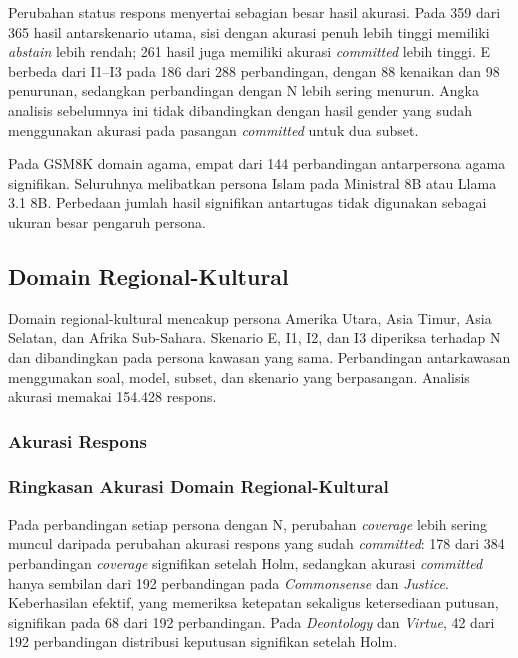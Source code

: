 Perubahan status respons menyertai sebagian besar hasil akurasi. Pada 359 dari
365 hasil antarskenario utama, sisi dengan akurasi penuh lebih tinggi memiliki
\textit{abstain} lebih rendah; 261 hasil juga memiliki akurasi
\textit{committed} lebih tinggi. E berbeda dari I1--I3 pada 186 dari 288
perbandingan, dengan 88 kenaikan dan 98 penurunan, sedangkan perbandingan dengan
N lebih sering menurun. Angka analisis sebelumnya ini tidak dibandingkan
dengan hasil gender yang sudah menggunakan akurasi pada pasangan
\textit{committed} untuk dua subset.

Pada GSM8K domain agama, empat dari 144 perbandingan antarpersona agama
signifikan. Seluruhnya melibatkan persona Islam pada Ministral 8B atau
Llama 3.1 8B. Perbedaan jumlah hasil signifikan antartugas tidak digunakan
sebagai ukuran besar pengaruh persona.

\subsection{Domain Regional-Kultural}
\label{subsec:hasil-regional-ethics}

Domain regional-kultural mencakup persona Amerika Utara, Asia Timur, Asia
Selatan, dan Afrika Sub-Sahara. Skenario E, I1, I2, dan I3 diperiksa terhadap
N dan dibandingkan pada persona kawasan yang sama. Perbandingan antarkawasan
menggunakan soal, model, subset, dan skenario yang berpasangan. Analisis
akurasi memakai 154.428 respons.

\subsubsection{Akurasi Respons}
\label{subsubsec:akurasi-regional-ethics}



\subsubsection{Ringkasan Akurasi Domain Regional-Kultural}
\label{subsubsec:ringkasan-akurasi-regional-ethics}

Pada perbandingan setiap persona dengan N, perubahan \textit{coverage}
lebih sering muncul daripada perubahan akurasi respons yang sudah
\textit{committed}: 178 dari 384 perbandingan \textit{coverage} signifikan
setelah Holm, sedangkan akurasi \textit{committed} hanya sembilan dari 192
perbandingan pada \textit{Commonsense} dan \textit{Justice}. Keberhasilan
efektif, yang memeriksa ketepatan sekaligus ketersediaan putusan, signifikan
pada 68 dari 192 perbandingan. Pada \textit{Deontology} dan \textit{Virtue},
42 dari 192 perbandingan distribusi keputusan signifikan setelah Holm.

